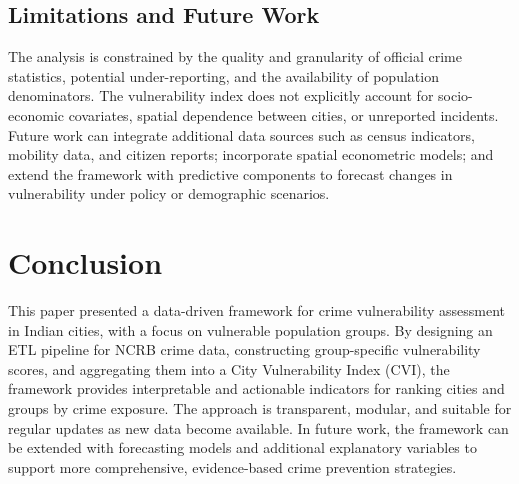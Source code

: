 \documentclass[conference]{IEEEtran}
\begin{document}
\subsection{Limitations and Future Work}
The analysis is constrained by the quality and granularity of official crime statistics, potential under-reporting, and the availability of population denominators. The vulnerability index does not explicitly account for socio-economic covariates, spatial dependence between cities, or unreported incidents. Future work can integrate additional data sources such as census indicators, mobility data, and citizen reports; incorporate spatial econometric models; and extend the framework with predictive components to forecast changes in vulnerability under policy or demographic scenarios.

\section{Conclusion}
This paper presented a data-driven framework for crime vulnerability assessment in Indian cities, with a focus on vulnerable population groups. By designing an ETL pipeline for NCRB crime data, constructing group-specific vulnerability scores, and aggregating them into a City Vulnerability Index (CVI), the framework provides interpretable and actionable indicators for ranking cities and groups by crime exposure. The approach is transparent, modular, and suitable for regular updates as new data become available. In future work, the framework can be extended with forecasting models and additional explanatory variables to support more comprehensive, evidence-based crime prevention strategies.
\end{document}
